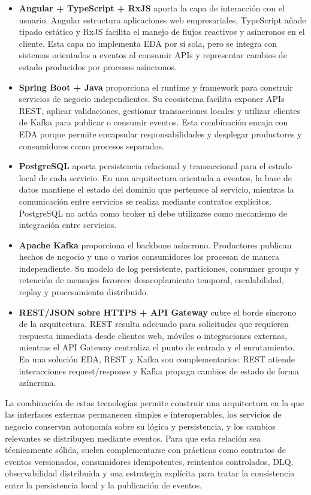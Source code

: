 \documentclass[12pt,a4paper]{article}
\begin{document}
\begin{itemize}[leftmargin=*]
    \item \textbf{Angular + TypeScript + RxJS} aporta la capa de interacción con el usuario. Angular estructura aplicaciones web empresariales, TypeScript añade tipado estático y RxJS facilita el manejo de flujos reactivos y asíncronos en el cliente. Esta capa no implementa EDA por sí sola, pero se integra con sistemas orientados a eventos al consumir APIs y representar cambios de estado producidos por procesos asíncronos.
    \item \textbf{Spring Boot + Java} proporciona el runtime y framework para construir servicios de negocio independientes. Su ecosistema facilita exponer APIs REST, aplicar validaciones, gestionar transacciones locales y utilizar clientes de Kafka para publicar o consumir eventos. Esta combinación encaja con EDA porque permite encapsular responsabilidades y desplegar productores y consumidores como procesos separados.
    \item \textbf{PostgreSQL} aporta persistencia relacional y transaccional para el estado local de cada servicio. En una arquitectura orientada a eventos, la base de datos mantiene el estado del dominio que pertenece al servicio, mientras la comunicación entre servicios se realiza mediante contratos explícitos. PostgreSQL no actúa como broker ni debe utilizarse como mecanismo de integración entre servicios.
    \item \textbf{Apache Kafka} proporciona el backbone asíncrono. Productores publican hechos de negocio y uno o varios consumidores los procesan de manera independiente. Su modelo de log persistente, particiones, consumer groups y retención de mensajes favorece desacoplamiento temporal, escalabilidad, replay y procesamiento distribuido.
    \item \textbf{REST/JSON sobre HTTPS + API Gateway} cubre el borde síncrono de la arquitectura. REST resulta adecuado para solicitudes que requieren respuesta inmediata desde clientes web, móviles o integraciones externas, mientras el API Gateway centraliza el punto de entrada y el enrutamiento. En una solución EDA, REST y Kafka son complementarios: REST atiende interacciones request/response y Kafka propaga cambios de estado de forma asíncrona.
\end{itemize}

La combinación de estas tecnologías permite construir una arquitectura en la que las interfaces externas permanecen simples e interoperables, los servicios de negocio conservan autonomía sobre su lógica y persistencia, y los cambios relevantes se distribuyen mediante eventos. Para que esta relación sea técnicamente sólida, suelen complementarse con prácticas como contratos de eventos versionados, consumidores idempotentes, reintentos controlados, DLQ, observabilidad distribuida y una estrategia explícita para tratar la consistencia entre la persistencia local y la publicación de eventos.
\end{document}
